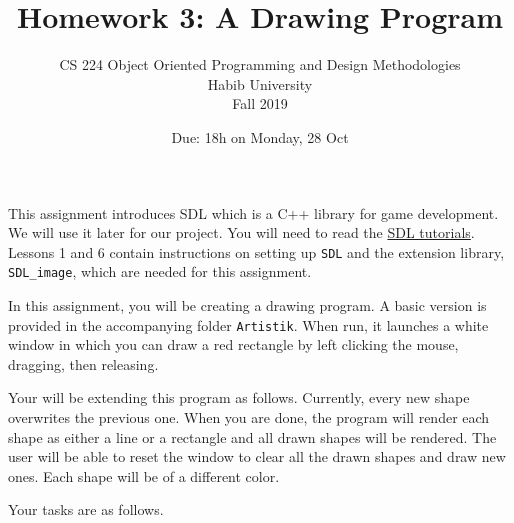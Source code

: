 \documentclass[addpoints]{exam}
\title{Homework 3: A Drawing Program}
\author{CS 224 Object Oriented Programming and Design Methodologies\\Habib University\\Fall 2019}
\date{Due: 18h on Monday, 28 Oct}
\begin{document}
\maketitle
\thispagestyle{empty}

This assignment introduces SDL which is a C++ library for game development. We will use it later for our project. You will need to read the \href{http://lazyfoo.net/tutorials/SDL/}{SDL tutorials}. Lessons 1 and 6 contain instructions on setting up \texttt{SDL} and the extension library, \texttt{SDL\_image}, which are needed for this assignment.

\begin{questions}

In this assignment, you will be creating a drawing program. A basic version is provided in the accompanying folder \texttt{Artistik}. When run, it launches a white window in which you can draw a red rectangle by left clicking the mouse, dragging, then releasing. 

Your will be extending this program as follows. Currently, every new shape overwrites the previous one. When you are done, the program will render each shape as either a line or a rectangle and all drawn shapes will be rendered. The user will be able to reset the window to clear all the drawn shapes and draw new ones. Each shape will be of a different color.

Your tasks are as follows.
\end{questions}
\end{document}
